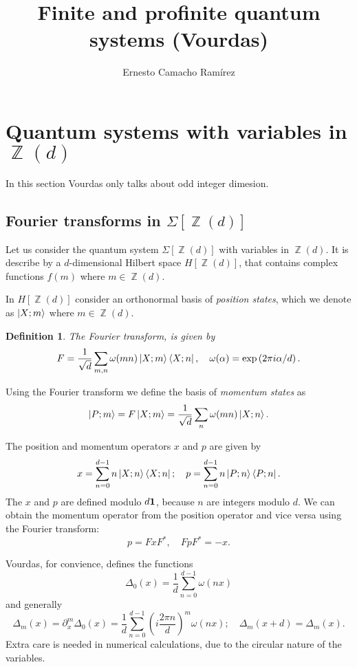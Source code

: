 \documentclass[a4paper]{article}
\title{Finite and profinite quantum systems (Vourdas)}
\author{Ernesto Camacho Ramírez}
\DeclareMathOperator{\Z}{\mathbb{Z}}
\newtheorem{definition}{Definition}
\begin{document}
  \maketitle
  
  \section{Quantum systems with variables in $\Z(d)$ }

  In this section Vourdas only talks about odd integer
  dimesion.

  \subsection{Fourier transforms in $\Sigma[\Z(d)]$}

  Let us consider the quantum system $\Sigma[\Z(d)]$ with
  variables in $\Z(d)$. It is describe by a $d$-dimensional
  Hilbert space $H[\Z(d)]$, that contains complex functions
  $f(m)$ where $m \in \Z(d)$.

  In $H[\Z(d)]$ consider an orthonormal basis of
  \textit{position states}, which we denote as $\ket{X; m}$ 
  where $m \in \Z(d)$. 

  \begin{definition}
    The Fourier transform, is given by
    \[
      F = 
      \frac{1}{\sqrt{d}}
      \sum_{m,n}^{} \omega(mn) \ket{X;m} \bra{X;n},
      \quad
      \omega(\alpha) = \exp\left( 2\pi i \alpha / d \right).
    \] 
  \end{definition}

  Using the Fourier transform we define the basis of
  \textit{momentum states} as
  \[
    \ket{P; m}
    = F\ket{X; m}
    = \frac{1}{\sqrt{d}} \sum_{n}^{} \omega(mn) \ket{X; n}.
  \]

  The position and momentum operators $x$ and $p$ are given
  by
  \[
    x = \sum_{n=0}^{d-1} n \ket{X; n} \bra{X; n};
    \quad
    p = \sum_{n=0}^{d-1} n \ket{P; n} \bra{P; n}.
  \] 
  The $x$ and $p$ are defined modulo $d \bf{1}$, because $n$ 
  are integers modulo $d$. We can obtain the momentum
  operator from the position operator and vice versa using
  the Fourier transform:
  \[
    p = FxF^{*},
    \quad FpF^{*} = -x.
  \] 

  Vourdas, for convience, defines the functions
  \[
    \Delta_0(x)
    = \frac{1}{d} \sum_{n=0}^{d-1} \omega(nx)
  \] 
  and generally
  \[
    \Delta_m(x)
    = \partial_x^{m} \Delta_0(x)
    = \frac{1}{d} \sum_{n=0}^{d-1} \left( i \frac{2\pi n}{d}
    \right)^{m} \omega(nx);
    \quad
    \Delta_m(x+d) = \Delta_m(x).
  \] 
  Extra care is needed in numerical calculations, due to the
  circular nature of the variables. 
\end{document}
